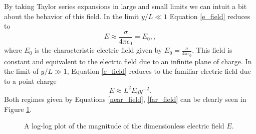 \documentclass[12pt,a4paper,oneside]{book}
\begin{document}
By taking Taylor series expansions in large and small limits we can intuit a bit about the behavior of this field. In the limit $y/L \ll 1$ Equation \ref{e_field} reduces to
\begin{equation}
\label{near_field}
E \approx \frac{\sigma}{4 \pi \epsilon_0} = E_0,
,\end{equation}
where $E_0$ is the characteristic electric field given by $E_0 = \frac{\sigma}{4 \pi \epsilon_0}$. This field is constant and equivalent to the electric field due to an infinite plane of charge. In the limit of $y/L \gg 1$, Equation \ref{e_field} reduces to the familiar electric field due to a point charge
\begin{equation}
\label{far_field}
E \approx L^2 E_0 y^{-2}.
\end{equation}
Both regimes given by Equations \ref{near_field}, \ref{far_field} can be clearly seen in Figure \ref{fig:E0}.
\begin{figure}[h]
    \centering
    \def\svgwidth{\columnwidth}
    
    \caption{A log-log plot of the magnitude of the dimensionless electric field $E$.\label{fig:E0}}
\end{figure}
\newpage
\end{document}
